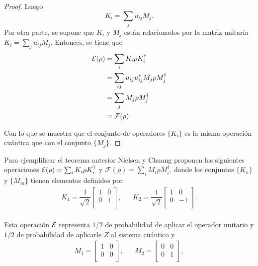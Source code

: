 \begin{proof}
Luego \[K_i=\sum_j u_{ij}M_j.\]Por otra parte, se supone que $K_i$ y $M_j$ están relacionados por la matriz unitaria $K_i=\sum_j u_{ij}M_j$. Entonces, se tiene que
\begin{equation}
    \begin{split}
        \mathcal{E}(\rho)&=\sum_i  K_i\rho K_i^\dagger\\
            &=\sum_{ij} u_{ij}u_{ij}^*M_j\rho M_j^\dagger\\
            &=\sum_j M_j\rho M_j^\dagger\\
            &=\mathcal{F}(\rho).
    \end{split}
\end{equation}

Con lo que se muestra que el conjunto de operadores $\{K_i\}$ es la misma operación cuántica que con el conjunto $\{M_j\}$.
\end{proof}

Para ejemplificar el teorema anterior Nielsen y Chuang {\cite{nielsen_chuang_2010}} proponen las siguientes operaciones $\mathcal{E}(\rho)=\sum_i K_i\rho K_i^\dagger$ y $\mathcal{F}(\rho)=\sum_i M_i\rho M_i^\dagger$, donde los conjuntos $\{K_n\}$ y $\{M_m\}$ tienen elementos definidos por 
\begin{equation}
    \begin{array}{ccc}
        K_1=\dfrac{1}{\sqrt{2}}\begin{bmatrix}
            1&0\\
            0&1\\
        \end{bmatrix},&&K_2=\dfrac{1}{\sqrt{2}}\begin{bmatrix}
            1&0\\
            0&-1\\
        \end{bmatrix}.\\
    \end{array}
\end{equation}

Esta operación $\mathcal{E}$ representa $1/2$ de probabilidad de aplicar el operador unitario y $1/2$ de probabilidad de aplicarle $Z$ al sistema cuántico y
\begin{equation}
    \begin{array}{ccc}
        M_1=\begin{bmatrix}
            1&0\\
            0&0\\
        \end{bmatrix},&&M_2=\begin{bmatrix}
            0&0\\
            0&1\\
        \end{bmatrix},\\
    \end{array}
\end{equation}

